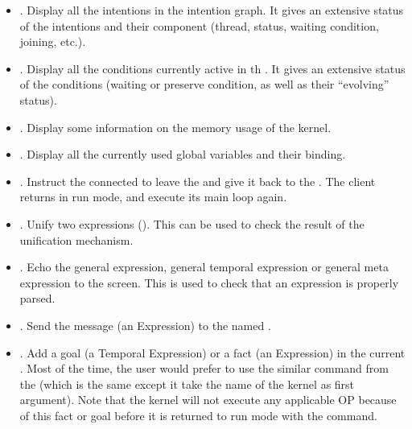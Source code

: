 \begin{itemize}

\item {}. Display all the intentions in the intention graph.
It gives an extensive status of the intentions and their component (thread,
status, waiting condition, joining, etc.).

\item {}. Display all the conditions currently active in th
\CPK{}. It gives an extensive status of the conditions (waiting or preserve
condition, as well as their ``evolving'' status).

\item {}. Display some information on the memory usage of the
kernel. 

\item {}. Display all the currently used global variables and
their binding.

\item {}. Instruct the connected \COPRS{} to leave the
 and give it back to the \OPRSS{}. The \COPRS{} client returns
in run mode, and execute its main loop again.

\item {}. Unify two expressions
(). This can be used to check the result of the
unification mechanism.

\item {}. Echo the general
expression, general temporal expression or general meta expression to the
screen. This is used to check that an expression is properly parsed.

\item {}. Send the message (an Expression) to the
\COPRS{} named .

\item {}. Add a goal (a Temporal Expression) or a fact
(an Expression) in the current \CPK{}. Most of the time, the user
would prefer to use the similar command from the \OPRSS{} (which is the
same except it take the name of the kernel as first argument). Note that
the kernel will not execute any applicable OP because of this fact or
goal before it is returned to run mode with the  command.


\end{itemize}
